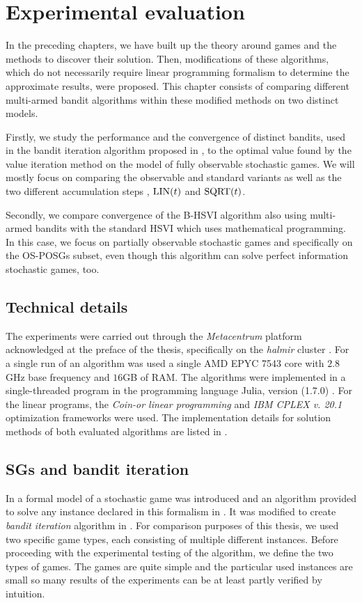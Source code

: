 \documentclass[../main.tex]{subfiles}
\begin{document}
\chapter{Experimental evaluation}\label{exp}
In the preceding chapters, we have built up the theory around games and the methods to discover their solution.
Then, modifications of these algorithms, which do not necessarily require linear programming formalism to determine the approximate results, were proposed.
This chapter consists of comparing different multi-armed bandit algorithms within these modified methods on two distinct models.

Firstly, we study the performance and the convergence of distinct bandits, used in the bandit iteration algorithm proposed in , to the optimal value found by the value iteration method on the model of fully observable stochastic games.
We will mostly focus on comparing the observable and standard variants as well as the two different accumulation steps , $\text{LIN}(t)$ and $\text{SQRT}(t)$.

Secondly, we compare convergence of the B-HSVI  algorithm also using multi-armed bandits with the standard HSVI  which uses mathematical programming.
In this case, we focus on partially observable stochastic games and specifically on the OS-POSGs subset, even though this algorithm can solve perfect information stochastic games, too.

\section{Technical details}\label{exp:tech}
The experiments were carried out through the \textit{Metacentrum} platform acknowledged at the preface of the thesis, specifically on the \textit{halmir} cluster \cite{halmir}.
For a single run of an algorithm was used a single AMD EPYC 7543 core with $2.8$GHz base frequency and $16$GB of RAM.
The algorithms were implemented in a single-threaded program in the programming language Julia, version (1.7.0) \cite{julia}.
For the linear programs, the \textit{Coin-or linear programming} \cite{clp} and \textit{IBM CPLEX v. 20.1} optimization frameworks were used.
The implementation details for solution methods of both evaluated algorithms are listed in .

\section{SGs and bandit iteration}\label{exp:sg}
In  a formal model of a stochastic game was introduced and an algorithm provided to solve any instance declared in this formalism in .
It was modified to create \textit{bandit iteration} algorithm in .
For comparison purposes of this thesis, we used two specific game types, each consisting of multiple different instances.
Before proceeding with the experimental testing of the algorithm, we define the two types of games.
The games are quite simple and the particular used instances are small so many results of the experiments can be at least partly verified by intuition.
\end{document}
